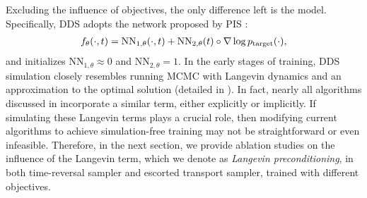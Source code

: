 Excluding the influence of objectives, the only difference left is the model.
Specifically,  DDS adopts the network proposed by PIS \citep{zhangpath}:
\begin{align}\label{eq:DDS_network}
  f_\theta(\cdot, t) = \text{NN}_{1,\theta}(\cdot, t) + \text{NN}_{2, \theta}(t) \circ  \nabla\log p_\text{target}(\cdot),
\end{align}
and initializes $\text{NN}_{1,\theta} \approx 0$ and $\text{NN}_{2, \theta}=1$.
In the early stages of training, DDS simulation closely resembles running MCMC with Langevin dynamics and an approximation to the optimal solution (detailed in ). 
In fact, nearly all algorithms discussed in  incorporate a similar term, either explicitly or implicitly. 
If simulating these Langevin terms plays a crucial role, then modifying current algorithms to achieve simulation-free training may not be straightforward or even infeasible.
Therefore, in the next section, we provide ablation studies on the influence of the Langevin term, which we denote as \emph{Langevin preconditioning}, in both time-reversal sampler and escorted transport sampler, trained with different objectives.





